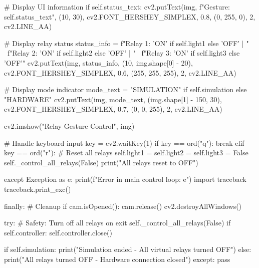 \begin{aivncodebox}
\begin{python}
                # Display UI information
                if self.status_text:
                    cv2.putText(img, f"Gesture: {self.status_text}", (10, 30), 
                               cv2.FONT_HERSHEY_SIMPLEX, 0.8, (0, 255, 0), 2, cv2.LINE_AA)
                
                # Display relay status
                status_info = f"Relay 1: {'ON' if self.light1 else 'OFF'} | " \
                             f"Relay 2: {'ON' if self.light2 else 'OFF'} | " \
                             f"Relay 3: {'ON' if self.light3 else 'OFF'}"
                cv2.putText(img, status_info, (10, img.shape[0] - 20), 
                           cv2.FONT_HERSHEY_SIMPLEX, 0.6, (255, 255, 255), 2, cv2.LINE_AA)
                
                # Display mode indicator
                mode_text = "SIMULATION" if self.simulation else "HARDWARE"
                cv2.putText(img, mode_text, (img.shape[1] - 150, 30), 
                           cv2.FONT_HERSHEY_SIMPLEX, 0.7, (0, 0, 255), 2, cv2.LINE_AA)
                
                cv2.imshow("Relay Gesture Control", img)
                
                # Handle keyboard input
                key = cv2.waitKey(1)
                if key == ord("q"):
                    break
                elif key == ord("r"):
                    # Reset all relays
                    self.light1 = self.light2 = self.light3 = False
                    self._control_all_relays(False)
                    print("All relays reset to OFF")
        
        except Exception as e:
            print(f"Error in main control loop: {e}")
            import traceback
            traceback.print_exc()
        
        finally:
            # Cleanup
            if cam.isOpened():
                cam.release()
            cv2.destroyAllWindows()
            
            try:
                # Safety: Turn off all relays on exit
                self._control_all_relays(False)
                if self.controller:
                    self.controller.close()
                
                if self.simulation:
                    print("Simulation ended - All virtual relays turned OFF")
                else:
                    print("All relays turned OFF - Hardware connection closed")
            except:
                pass


\end{python}
\end{aivncodebox}
